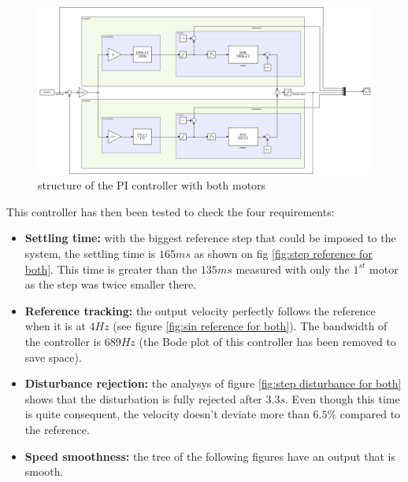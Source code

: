 \begin{figure}[H]
    \centering
    \includegraphics[width=\textwidth]{Pictures/simulink_whole_controller.png}
    \caption{structure of the PI controller with both motors}
    \label{fig:structure whole PI}
\end{figure}

This controller has then been tested to check the four requirements:

\begin{itemize}
    \item \textbf{Settling time:} with the biggest reference step that could be imposed to the
    system, the settling time is $165 ms$ as shown on fig \ref{fig:step reference for both}. 
    This time is greater than the $135 ms$ measured with only the $1^{st}$ motor as the step was 
    twice smaller there.
    \item \textbf{Reference tracking:} the output velocity perfectly follows the reference when it
    is at $4 Hz$ (see figure \ref{fig:sin reference for both}). The bandwidth of the controller is
    $689 Hz$ (the Bode plot of this controller has been removed to save space).
    \item \textbf{Disturbance rejection:} the analysys of figure 
    \ref{fig:step disturbance for both} shows that the disturbation is fully rejected after $3.3 s$.
    Even though this time is quite consequent, the velocity doesn't deviate more than $6.5 \%$
    compared to the reference.
    \item \textbf{Speed smoothness: } the tree of the following figures have an output that is smooth.
\end{itemize}

